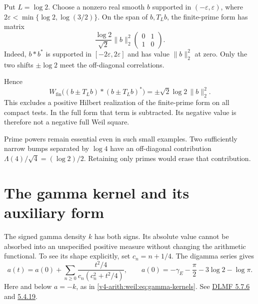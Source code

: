 \begin{example}
\label{v4-arith:weil:ex:prime-signs}
Put \(L=\log2\). Choose a nonzero real smooth \(b\) supported in
\((-\varepsilon,\varepsilon)\), where
\(2\varepsilon<\min\{\log2,\log(3/2)\}\).
On the span of \(b,T_Lb\), the finite-prime form has matrix
\begin{equation}
 \frac{\log2}{\sqrt2}\|b\|_2^2
                  \begin{pmatrix}0&1\\1&0\end{pmatrix}.
 \label{v4-arith:weil:eq:prime-signs}
\end{equation}
Indeed, \(b*b^*\) is supported in \([-2\varepsilon,2\varepsilon]\)
and has value \(\|b\|_2^2\) at zero. Only the two shifts
\(\pm\log2\) meet the off-diagonal correlations.

Hence
\[
 W_{\mathrm{fin}}\bigl((b\pm T_Lb)*(b\pm T_Lb)^*\bigr)
                    =\pm\sqrt2\log2\,\|b\|_2^2.
\]
This excludes a positive Hilbert realization of the finite-prime
form on all compact tests. In the full form that term is subtracted.
Its negative value is therefore not a negative full Weil square.
\end{example}

Prime powers remain essential even in such small examples.
Two sufficiently narrow bumps separated by \(\log4\) have an
off-diagonal contribution \(\Lambda(4)/\sqrt4=(\log2)/2\).
Retaining only primes would erase that contribution.

\section{The gamma kernel and its auxiliary form}
\label{v4-arith:weil:gamma}

The signed gamma density \(k\) has both signs. Its absolute value
cannot be absorbed into an unspecified positive measure without
changing the arithmetic functional.
To see its shape explicitly, set \(c_n=n+1/4\). The digamma series gives
\begin{equation}
 a(t)=a(0)+\sum_{n\ge0}
       \frac{t^2/4}{c_n(c_n^2+t^2/4)},\qquad
 a(0)=-\gamma_E-\frac\pi2-3\log2-\log\pi.
 \label{v4-arith:weil:eq:digamma}
\end{equation}
Here and below \(a=-k\), as in
\eqref{v4-arith:weil:eq:gamma-kernels}.
See
\href{https://dlmf.nist.gov/5.7.E6}{DLMF 5.7.6} and
\href{https://dlmf.nist.gov/5.4.E19}{5.4.19}.

